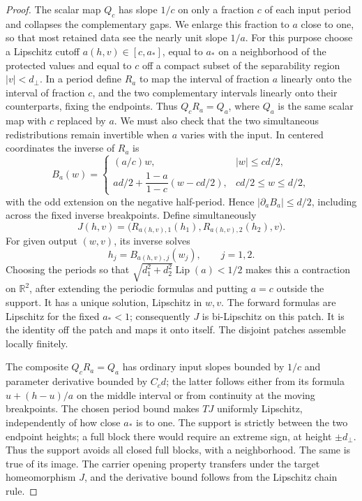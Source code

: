 \documentclass[11pt]{article}
\numberwithin{equation}{section}
\theoremstyle{definition}
\theoremstyle{remark}
\begin{document}
\begin{proof}
The scalar map $Q_c$ has slope $1/c$ on only a fraction $c$ of each
input period and collapses the complementary gaps.  We enlarge this
fraction to $a$ close to one, so that most retained data see the nearly
unit slope $1/a$.  For this purpose choose a Lipschitz cutoff
$a(h,v)\in[c,a_*]$, equal to $a_*$ on a
neighborhood of the protected values and equal to $c$ off a compact
subset of the separability region $|v|<d_\perp$.  In a period define
$R_a$ to map the interval of fraction $a$ linearly onto the interval of
fraction $c$, and the two complementary intervals linearly onto their
counterparts, fixing the endpoints.  Thus $Q_cR_a=Q_a$, where $Q_a$
is the same scalar map with $c$ replaced by $a$.
We must also check that the two simultaneous redistributions remain
invertible when $a$ varies with the input.  In centered coordinates
the inverse of $R_a$ is
\[
 B_a(w)=
 \begin{cases}
 (a/c)w,&|w|\leq cd/2,\\
 ad/2+\dfrac{1-a}{1-c}(w-cd/2),&cd/2\leq w\leq d/2,
 \end{cases}
\]
with the odd extension on the negative half-period.  Hence
$|\partial_a B_a|\leq d/2$, including across the fixed inverse
breakpoints.  Define simultaneously
\[
 J(h,v)=\bigl(R_{a(h,v),1}(h_1),R_{a(h,v),2}(h_2),v\bigr).
\]
For given output $(w,v)$, its inverse solves
\[
 h_j=B_{a(h,v),j}(w_j),\qquad j=1,2.
\]
Choosing the periods so that
$\sqrt{d_1^2+d_2^2}\operatorname{Lip}(a)<1/2$ makes this a contraction on $\mathbb R^2$,
after extending the periodic formulas and putting $a=c$ outside the
support.  It has a unique solution, Lipschitz in $w,v$.  The forward
formulas are Lipschitz for the fixed $a_*<1$; consequently $J$ is
bi-Lipschitz on this patch.  It is the identity off the patch and maps
it onto itself.  The disjoint patches assemble locally finitely.

The composite $Q_cR_a=Q_a$ has ordinary input slopes bounded
by $1/c$ and parameter derivative bounded by $C_cd$; the latter follows
either from its formula $u+(h-u)/a$ on the middle interval or from
continuity at the moving breakpoints.  The chosen period bound makes
$TJ$ uniformly Lipschitz, independently of how close $a_*$ is to one.
The support is strictly between the two endpoint heights; a full block
there would require an extreme sign, at height $\pm d_\perp$.
Thus the support avoids all closed full blocks, with a neighborhood.
The same is true of its image.  The carrier opening property transfers
under the target homeomorphism $J$, and the derivative bound follows
from the Lipschitz chain rule.


\end{proof}
\end{document}
